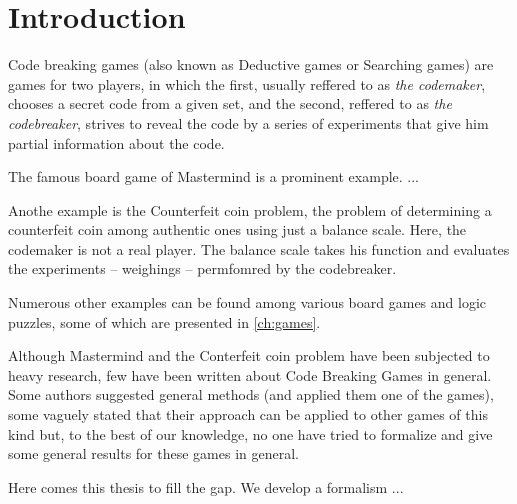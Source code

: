  \chapter{Introduction}


Code breaking games (also known as Deductive games or Searching games)
are games for two players, in which the first, usually reffered to as
\emph{the codemaker}, chooses a secret code from a given set, and the second,
reffered to as \emph{the codebreaker}, strives to reveal the code by a series
of experiments that give him partial information about the code.

The famous board game of Mastermind is a prominent example.
...

Anothe example is the Counterfeit coin problem, the problem of determining
a counterfeit coin among authentic ones using just a balance scale.
Here, the codemaker is not a real player. The balance scale takes his function
and evaluates the experiments -- weighings -- permfomred by the codebreaker.

Numerous other examples can be found among various board games and logic puzzles,
 some of which are presented in \autoref{ch:games}.


Although Mastermind and the Conterfeit coin problem have been subjected to
heavy research, few have been written about Code Breaking Games in general.
Some authors suggested general methods (and applied them one of the games),
some vaguely stated that their approach can be applied to other games of this kind but,
to the best of our knowledge, no one have tried to formalize and give some
general results for these games in general.

Here comes this thesis to fill the gap. We develop a formalism
...
